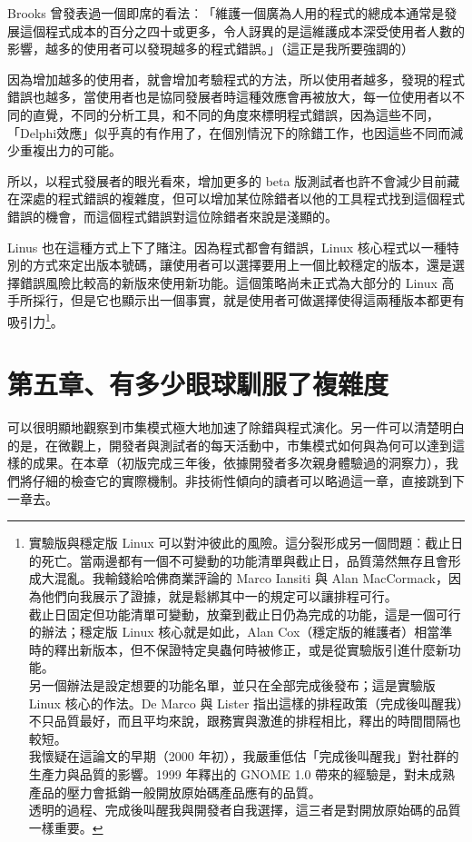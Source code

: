 \documentclass[10pt, b5paper]{book}
\begin{document}
Brooks
曾發表過一個即席的看法︰「維護一個廣為人用的程式的總成本通常是發展這個程式成本的百分之四十或更多，令人訝異的是這維護成本深受使用者人數的影響，越多的使用者可以發現越多的程式錯誤。」（這正是我所要強調的）

因為增加越多的使用者，就會增加考驗程式的方法，所以使用者越多，發現的程式錯誤也越多，當使用者也是協同發展者時這種效應會再被放大，每一位使用者以不同的直覺，不同的分析工具，和不同的角度來標明程式錯誤，因為這些不同，「Delphi效應」似乎真的有作用了，在個別情況下的除錯工作，也因這些不同而減少重複出力的可能。

所以，以程式發展者的眼光看來，增加更多的 beta
版測試者也許不會減少目前藏在深處的程式錯誤的複雜度，但可以增加某位除錯者以他的工具程式找到這個程式錯誤的機會，而這個程式錯誤對這位除錯者來說是淺顯的。

Linus 也在這種方式上下了賭注。因為程式都會有錯誤，Linux
核心程式以一種特別的方式來定出版本號碼，讓使用者可以選擇要用上一個比較穩定的版本，還是選擇錯誤風險比較高的新版來使用新功能。這個策略尚未正式為大部分的
Linux
高手所採行，但是它也顯示出一個事實，就是使用者可做選擇使得這兩種版本都更有吸引力\footnote{實驗版與穩定版
  Linux
  可以對沖彼此的風險。這分裂形成另一個問題︰截止日的死亡。當兩邊都有一個不可變動的功能清單與截止日，品質蕩然無存且會形成大混亂。我輸錢給哈佛商業評論的
  Marco Iansiti 與 Alan
  MacCormack，因為他們向我展示了證據，就是鬆綁其中一的規定可以讓排程可行。\\截止日固定但功能清單可變動，放棄到截止日仍為完成的功能，這是一個可行的辦法；穩定版
  Linux 核心就是如此，Alan
  Cox（穩定版的維護者）相當準時的釋出新版本，但不保證特定臭蟲何時被修正，或是從實驗版引進什麼新功能。\\另一個辦法是設定想要的功能名單，並只在全部完成後發布；這是實驗版
  Linux 核心的作法。De Marco 與 Lister
  指出這樣的排程政策（完成後叫醒我）不只品質最好，而且平均來說，跟務實與激進的排程相比，釋出的時間間隔也較短。\\我懷疑在這論文的早期（2000
  年初），我嚴重低估「完成後叫醒我」對社群的生產力與品質的影響。1999
  年釋出的 GNOME 1.0
  帶來的經驗是，對未成熟產品的壓力會抵銷一般開放原始碼產品應有的品質。\\透明的過程、完成後叫醒我與開發者自我選擇，這三者是對開放原始碼的品質一樣重要。}。

\newpage
\section{第五章、有多少眼球馴服了複雜度}

可以很明顯地觀察到市集模式極大地加速了除錯與程式演化。另一件可以清楚明白的是，在微觀上，開發者與測試者的每天活動中，市集模式如何與為何可以達到這樣的成果。在本章（初版完成三年後，依據開發者多次親身體驗過的洞察力），我們將仔細的檢查它的實際機制。非技術性傾向的讀者可以略過這一章，直接跳到下一章去。
\end{document}
